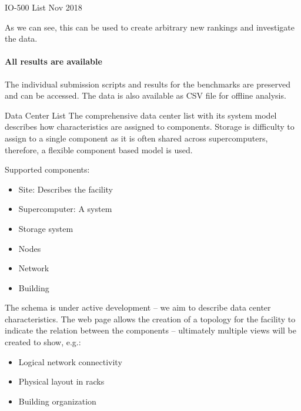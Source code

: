 \documentclass[portrait,a0paper,fontscale=0.4]{baposter}
\newcommand{\compresslist}{%
\setlength{\itemsep}{1pt}%
\setlength{\parskip}{0pt}%
\setlength{\parsep}{0pt}%
}
\begin{document}
\begin{poster}
\begin{posterbox}[name=io500res,column=1,above=bottom,below=io500]{IO-500 List Nov 2018}
\vspace*{-1.5em}

As we can see, this can be used to create arbitrary new rankings and investigate the data.

\vspace*{-1em}

\paragraph{All results are available}

The individual submission scripts and results for the benchmarks are preserved and can be accessed.
The data is also available as CSV file for offline analysis.


\end{posterbox}



\begin{posterbox}[name=schedule,column=2,span=1, above=bottom, below=io500]{Data Center List}
The comprehensive data center list with its system model describes how characteristics are assigned to components.
Storage is difficulty to assign to a single component as it is often shared across supercomputers,
therefore, a flexible component based model is used.

Supported components:
\vspace*{-1em}
\begin{itemize}\compresslist
\item Site: Describes the facility
\item Supercomputer: A system
\item Storage system
\item Nodes
\item Network
\item Building
\end{itemize}

\vspace*{-1em}

The schema is under active development -- we aim to describe data center characteristics.
The web page allows the creation of a topology for the facility to indicate the relation between the components -- ultimately multiple views will be created to show, e.g.:

\vspace*{-1em}

\begin{itemize} \compresslist
  \item Logical network connectivity
  \item Physical layout in racks
  \item Building organization
\end{itemize}


\end{posterbox}
\end{poster}
\end{document}
